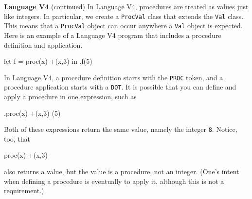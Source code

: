 \begin{minipage}[t]{\sw}
\slidenumber
\LARGE
{\bf Language V4} (continued)\exx
In Language V4, procedures are treated as values
just like integers.
In particular, we create a \verb'ProcVal' class
that extends the \verb'Val' class.
This means that a \verb'ProcVal' object can occur
anywhere a \verb'Val' object is expected.\exx
Here is an example of a Language V4 program
that includes a procedure definition and application.
\Large
\begin{qv}
let
  f = proc(x) +(x,3)
in
  .f(5)
\end{qv}
\LARGE
In Language V4, a procedure definition starts with the \verb'PROC' token,
and a procedure application starts with a \verb'DOT'.
It is possible that you can define and apply a procedure in one expression,
such as
\Large
\begin{qv}
.proc(x) +(x,3) (5)
\end{qv}
\LARGE
Both of these expressions return the same value,
namely the integer \verb'8'.
Notice, too, that
\Large
\begin{qv}
proc(x) +(x,3)
\end{qv}
\LARGE
also returns a value, but the value is a procedure, not an integer.
(One's intent when defining a procedure is eventually to apply it,
although this is not a requirement.)
\end{minipage}

\clearpage
